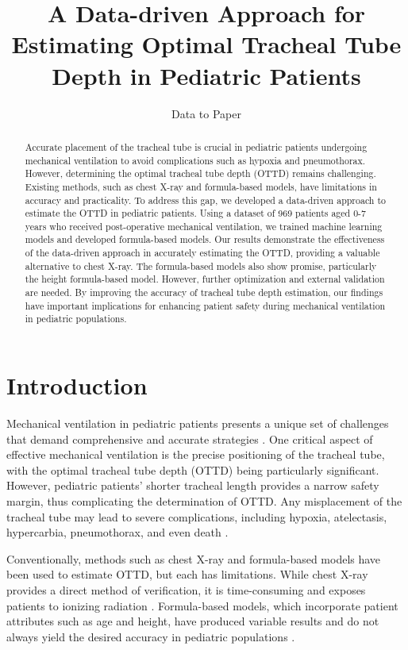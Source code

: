 \documentclass[11pt]{article}
\title{A Data-driven Approach for Estimating Optimal Tracheal Tube Depth in Pediatric Patients}
\author{Data to Paper}
\begin{document}
\maketitle
\begin{abstract}
Accurate placement of the tracheal tube is crucial in pediatric patients undergoing mechanical ventilation to avoid complications such as hypoxia and pneumothorax. However, determining the optimal tracheal tube depth (OTTD) remains challenging. Existing methods, such as chest X-ray and formula-based models, have limitations in accuracy and practicality. To address this gap, we developed a data-driven approach to estimate the OTTD in pediatric patients. Using a dataset of 969 patients aged 0-7 years who received post-operative mechanical ventilation, we trained machine learning models and developed formula-based models. Our results demonstrate the effectiveness of the data-driven approach in accurately estimating the OTTD, providing a valuable alternative to chest X-ray. The formula-based models also show promise, particularly the height formula-based model. However, further optimization and external validation are needed. By improving the accuracy of tracheal tube depth estimation, our findings have important implications for enhancing patient safety during mechanical ventilation in pediatric populations.
\end{abstract}
\section*{Introduction}

Mechanical ventilation in pediatric patients presents a unique set of challenges that demand comprehensive and accurate strategies \cite{Mariano2005ACO, Weiss2005AppropriatePO}. One critical aspect of effective mechanical ventilation is the precise positioning of the tracheal tube, with the optimal tracheal tube depth (OTTD) being particularly significant. However, pediatric patients' shorter tracheal length provides a narrow safety margin, thus complicating the determination of OTTD. Any misplacement of the tracheal tube may lead to severe complications, including hypoxia, atelectasis, hypercarbia, pneumothorax, and even death \cite{Weiss2006ClinicalEO}.

Conventionally, methods such as chest X-ray and formula-based models have been used to estimate OTTD, but each has limitations. While chest X-ray provides a direct method of verification, it is time-consuming and exposes patients to ionizing radiation \cite{Thomas2017ReliabilityOU}. Formula-based models, which incorporate patient attributes such as age and height, have produced variable results and do not always yield the desired accuracy in pediatric populations \cite{Mariano2005ACO}.
\end{document}
